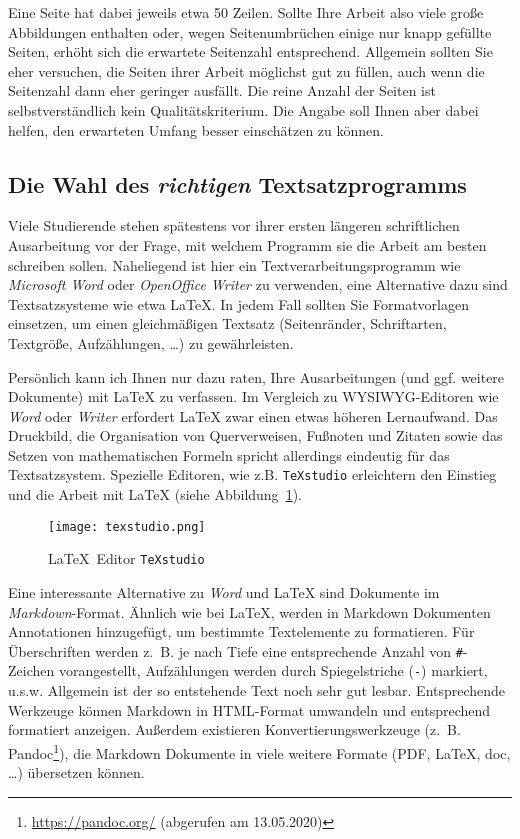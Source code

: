 Eine Seite hat dabei jeweils etwa 50 Zeilen.
Sollte Ihre Arbeit also viele große Abbildungen enthalten oder, wegen Seitenumbrüchen einige nur knapp gefüllte Seiten, erhöht sich die erwartete Seitenzahl entsprechend.
Allgemein sollten Sie eher versuchen, die Seiten ihrer Arbeit möglichst gut zu füllen, auch wenn die Seitenzahl dann eher geringer ausfällt.
Die reine Anzahl der Seiten ist selbstverständlich kein Qualitätskriterium.
Die Angabe soll Ihnen aber dabei helfen, den erwarteten Umfang besser einschätzen zu können.

\subsection{Die Wahl des \textit{richtigen} Textsatzprogramms}

Viele Studierende stehen spätestens vor ihrer ersten längeren schriftlichen Ausarbeitung vor der Frage, mit welchem Programm sie die Arbeit am besten schreiben sollen.
Naheliegend ist hier ein Textverarbeitungsprogramm wie \textit{Microsoft Word} oder \textit{OpenOffice Writer} zu verwenden, eine Alternative dazu sind  Textsatzsysteme wie etwa LaTeX.
In jedem Fall sollten Sie Formatvorlagen einsetzen, um einen gleichmäßigen Textsatz (Seitenränder, Schriftarten, Textgröße, Aufzählungen, \dots) zu gewährleisten.

Persönlich kann ich Ihnen nur dazu raten, Ihre Ausarbeitungen (und ggf. weitere Dokumente)  mit LaTeX zu verfassen.
Im Vergleich zu WYSIWYG-Editoren wie \textit{Word} oder \textit{Writer} erfordert LaTeX zwar einen etwas höheren Lernaufwand.
Das Druckbild, die Organisation von Querverweisen, Fußnoten und Zitaten sowie das Setzen von mathematischen Formeln spricht allerdings eindeutig für das Textsatzsystem.
Spezielle Editoren, wie z.B. \texttt{TeXstudio} erleichtern den Einstieg und die Arbeit mit LaTeX (siehe Abbildung~\ref{fig:editor}).
 
\begin{figure}
\centering
\texttt{[image: texstudio.png]}
\caption{\LaTeX\ Editor \texttt{TeXstudio}}
\label{fig:editor}
\end{figure}

Eine interessante Alternative zu \textit{Word} und LaTeX sind Dokumente im \textit{Markdown}-Format.
Ähnlich wie bei LaTeX, werden in Markdown Dokumenten Annotationen hinzugefügt, um bestimmte Textelemente zu formatieren.
Für Überschriften werden z.~B. je nach Tiefe eine entsprechende Anzahl von \texttt{\#}-Zeichen vorangestellt, Aufzählungen werden durch Spiegelstriche (\texttt{-})  markiert, u.s.w.
Allgemein ist der so entstehende Text noch sehr gut lesbar.
Entsprechende Werkzeuge können Markdown in HTML-Format umwandeln und entsprechend formatiert anzeigen.
Außerdem existieren Konvertierungswerkzeuge (z.~B. Pandoc\footnote{\url{https://pandoc.org/} (abgerufen am 13.05.2020)}), die Markdown Dokumente in viele weitere Formate (PDF, LaTeX, doc, \dots) übersetzen können.

